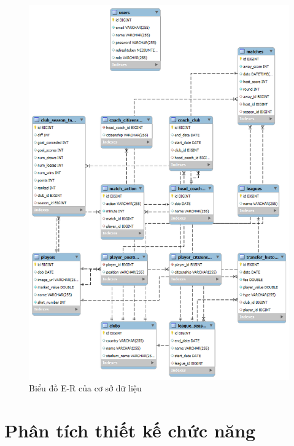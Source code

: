 \documentclass[../BTL.tex]{subfiles}
\begin{document}
\begin{figure}
    \centering
    \includegraphics[width=1\linewidth]{Hinhve/EER.png}
    \caption{Biểu đồ E-R của cơ sở dữ liệu}
    \label{fig:EER}
\end{figure}
\section{Phân tích thiết kế chức năng}
\end{document}
